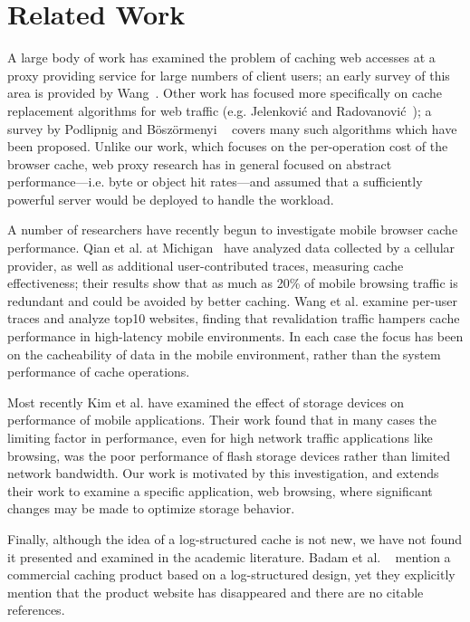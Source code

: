 \documentclass[letterpaper,twocolumn,10pt]{article}
\begin{document}
\section{Related Work}
A large body of work has examined the problem of caching web accesses at a proxy
providing service for large numbers of client users; an early survey of this
area is provided by Wang~\cite{wang_survey_1999}. Other work has focused more
specifically on cache replacement algorithms for web traffic
(e.g. Jelenkovi\'{c} and Radovanovi\'{c}~\cite{Jelenkovic_optimizing_2004}); a
survey by Podlipnig and B\"{o}sz\"{o}rmenyi ~\cite{podlipnig_survey_2003} covers
many such algorithms which have been proposed. Unlike our work, which focuses on
the per-operation cost of the browser cache, web proxy research has in general
focused on abstract performance---i.e. byte or object hit rates---and assumed
that a sufficiently powerful server would be deployed to handle the workload.

A number of researchers have recently begun to investigate mobile browser cache
performance. Qian et al. at Michigan~\cite{qian_web_2012} have analyzed data
collected by a cellular provider, as well as additional user-contributed traces,
measuring cache effectiveness; their results show that as much as 20\% of mobile
browsing traffic is redundant and could be avoided by better caching. Wang et
al. \cite{wang_how_2011} examine per-user traces and analyze top10 websites,
finding that revalidation traffic hampers cache performance in high-latency
mobile environments. In each case the focus has been on the cacheability of data
in the mobile environment, rather than the system performance of cache
operations.

Most recently Kim et al. \cite{kim12} have examined the effect of storage
devices on performance of mobile applications. Their work found that in many
cases the limiting factor in performance, even for high network traffic
applications like browsing, was the poor performance of flash storage devices
rather than limited network bandwidth. Our work is motivated by this
investigation, and extends their work to examine a specific application, web
browsing, where significant changes may be made to optimize storage behavior.

Finally, although the idea of a log-structured cache is not new, we have not
found it presented and examined in the academic literature.  Badam et
al. ~\cite{hashcache} mention a commercial caching product based on a
log-structured design, yet they explicitly mention that the product website has
disappeared and there are no citable references.
\end{document}
